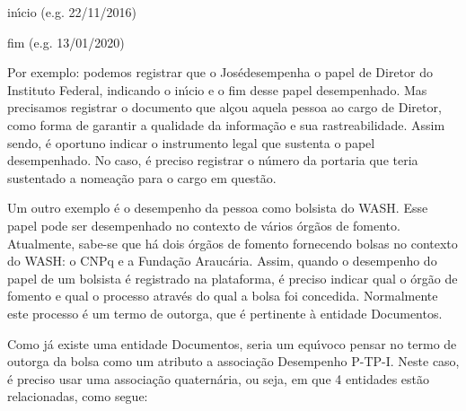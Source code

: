 \documentclass[
12pt,		%
openright,	%
twoside,  %
a4paper,			%
chapter=TITLE,		%
english,			%
french,				%
spanish,			%
brazil				%
]{USPSC-classe/USPSC}
\begin{document}
\begin{alineas}
\item in\'{\i}cio (e.g. 22/11/2016)
\item fim (e.g. 13/01/2020)
\end{alineas}

Por exemplo: podemos registrar que o \textquotedbl Jos\'e\textquotedbl  desempenha o papel de Diretor do Instituto Federal, indicando o in\'{\i}cio e o fim desse papel desempenhado. Mas precisamos registrar o documento que al\c{c}ou aquela pessoa ao cargo de Diretor, como forma de garantir a qualidade da informa\c{c}\~ao e sua rastreabilidade. Assim sendo, \'e oportuno indicar o instrumento legal que sustenta o papel desempenhado. No caso, \'e preciso registrar o n\'umero da portaria que teria sustentado a nomea\c{c}\~ao para o cargo em quest\~ao.










Um outro exemplo \'e o desempenho da pessoa como bolsista do WASH. Esse papel pode ser desempenhado no contexto de v\'arios \'org\~aos de fomento. Atualmente, sabe-se que h\'a dois \'org\~aos de fomento fornecendo bolsas no contexto do WASH: o CNPq e a Funda\c{c}\~ao Arauc\'aria. Assim, quando o desempenho do papel de um bolsista \'e registrado na plataforma, \'e preciso indicar qual o \'org\~ao de fomento e qual o processo atrav\'es do qual a bolsa foi concedida. Normalmente este processo \'e um termo de outorga, que \'e pertinente \`a entidade \textquotedbl Documentos\textquotedbl .










Como j\'a existe uma entidade \textquotedbl Documentos\textquotedbl , seria um equ\'{\i}voco pensar no termo de outorga da bolsa como um atributo a associa\c{c}\~ao \textquotedbl Desempenho P-TP-I\textquotedbl . Neste caso, \'e preciso usar uma associa\c{c}\~ao quatern\'aria, ou seja, em que 4 entidades est\~ao relacionadas, como segue:











\end{document}
